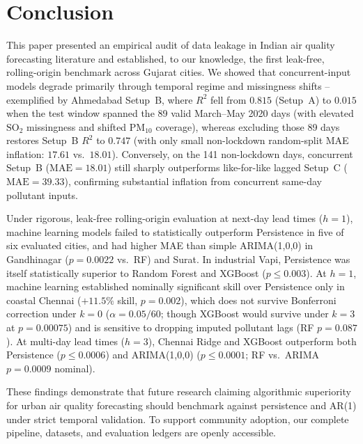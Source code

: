 \section{Conclusion}
\label{sec:conclusion}

This paper presented an empirical audit of data leakage in Indian air quality forecasting literature and established, to our knowledge, the first leak-free, rolling-origin benchmark across Gujarat cities. We showed that concurrent-input models degrade primarily through temporal regime and missingness shifts -- exemplified by Ahmedabad Setup~B, where $R^2$ fell from $0.815$ (Setup~A) to $0.015$ when the test window spanned the 89 valid March--May 2020 days (with elevated $\text{SO}_2$ missingness and shifted $\text{PM}_{10}$ coverage), whereas excluding those 89 days restores Setup~B $R^2$ to $0.747$ (with only small non-lockdown random-split MAE inflation: $17.61$ vs.\ $18.01$). Conversely, on the 141 non-lockdown days, concurrent Setup~B ($\text{MAE} = 18.01$) still sharply outperforms like-for-like lagged Setup~C ($\text{MAE} = 39.33$), confirming substantial inflation from concurrent same-day pollutant inputs.

Under rigorous, leak-free rolling-origin evaluation at next-day lead times ($h=1$), machine learning models failed to statistically outperform Persistence in five of six evaluated cities, and had higher MAE than simple ARIMA(1,0,0) in Gandhinagar ($p = 0.0022$ vs.\ RF) and Surat. In industrial Vapi, Persistence was itself statistically superior to Random Forest and XGBoost ($p \leq 0.003$). At $h=1$, machine learning established nominally significant skill over Persistence only in coastal Chennai ($+11.5\%$ skill, $p = 0.002$), which does not survive Bonferroni correction under $k=0$ ($\alpha = 0.05/60$; though XGBoost would survive under $k=3$ at $p = 0.00075$) and is sensitive to dropping imputed pollutant lags (RF $p = 0.087$). At multi-day lead times ($h=3$), Chennai Ridge and XGBoost outperform both Persistence ($p \le 0.0006$) and ARIMA(1,0,0) ($p \le 0.0001$; RF vs.\ ARIMA $p = 0.0009$ nominal).

These findings demonstrate that future research claiming algorithmic superiority for urban air quality forecasting should benchmark against persistence and AR(1) under strict temporal validation. To support community adoption, our complete pipeline, datasets, and evaluation ledgers are openly accessible.

